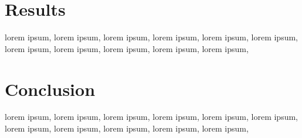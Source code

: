 \documentclass[conference]{IEEEtran}
\begin{document}
\section{Results}
lorem ipsum, lorem ipsum, lorem ipsum, lorem ipsum, lorem ipsum, lorem ipsum, lorem ipsum, lorem ipsum, lorem ipsum, lorem ipsum, lorem ipsum, 

\section{Conclusion}
lorem ipsum, lorem ipsum, lorem ipsum, lorem ipsum, lorem ipsum, lorem ipsum, lorem ipsum, lorem ipsum, lorem ipsum, lorem ipsum, lorem ipsum, 



\end{document}
